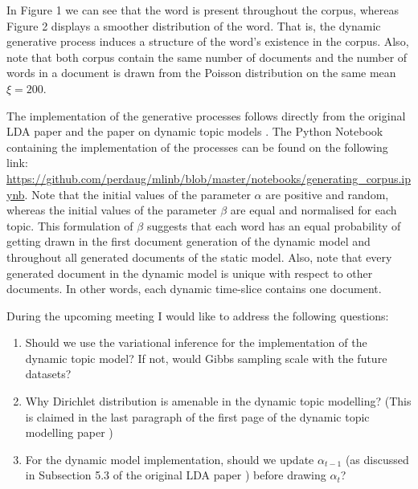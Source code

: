 \documentclass{article}
\begin{document}
In Figure 1 we can see that the word is present throughout the corpus, whereas Figure 2 displays a smoother distribution of the word. That is, the dynamic generative process induces a structure of the word's existence in the corpus. Also, note that both corpus contain the same number of documents and the number of words in a document is drawn from the Poisson distribution on the same mean $\xi = 200$.

The implementation of the generative processes follows directly from the original LDA paper \cite{Blei:2003:LDA:944919.944937} and the paper on dynamic topic models \cite{Blei:2006:DTM:1143844.1143859}. The Python Notebook containing the implementation of the processes can be found on the following link: \url{https://github.com/perdaug/mlinb/blob/master/notebooks/generating_corpus.ipynb}. Note that the initial values of the parameter $\alpha$ are positive and random, whereas the initial values of the parameter $\beta$ are equal and normalised for each topic. This formulation of $\beta$ suggests that each word has an equal probability of getting drawn in the first document generation of the dynamic model and throughout all generated documents of the static model. Also, note that every generated document in the dynamic model is unique with respect to other documents. In other words, each dynamic time-slice contains one document. 

During the upcoming meeting I would like to address the following questions:
\begin{enumerate}
\item Should we use the variational inference for the implementation of the dynamic topic model? If not, would Gibbs sampling scale with the future datasets?
\item Why Dirichlet distribution is amenable in the dynamic topic modelling? (This is claimed in the last paragraph of the first page of the dynamic topic modelling paper \cite{Blei:2006:DTM:1143844.1143859})
\item For the dynamic model implementation, should we update $\alpha_{t-1}$ (as discussed in Subsection 5.3 of the original LDA paper \cite{Blei:2003:LDA:944919.944937}) before drawing $\alpha_t$? 
\end{enumerate}



\end{document}
